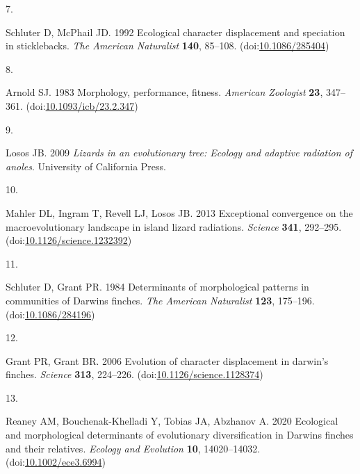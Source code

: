 \documentclass[
  11pt,
]{article}
\newlength{\cslhangindent}
\newlength{\csllabelwidth}
\newlength{\cslentryspacingunit} %
\newenvironment{CSLReferences}[2] %
 {%
  \setlength{\parindent}{0pt}
  \ifodd #1
  \let\oldpar\par
  \def\par{\hangindent=\cslhangindent\oldpar}
  \fi
  \setlength{\parskip}{#2\cslentryspacingunit}
 }%
 {}
\newcommand{\CSLLeftMargin}[1]{\parbox[t]{\csllabelwidth}{#1}}
\newcommand{\CSLRightInline}[1]{\parbox[t]{\linewidth - \csllabelwidth}{#1}\break}
\providecommand{\DIFaddbegin}{} %
\providecommand{\DIFaddend}{} %
\providecommand{\DIFdelbegin}{} %
\providecommand{\DIFdelend}{} %
\newcommand{\DIFscaledelfig}{0.5}
\newlength{\DIFdelgraphicswidth} %
\newlength{\DIFdelgraphicsheight} %
\newcommand{\DIFaddincludegraphics}[2][]{{\color{blue}\fbox{\DIFOincludegraphics[#1]{#2}}}} %
\newcommand{\DIFdelincludegraphics}[2][]{%
\sbox{\DIFdelgraphicsbox}{\DIFOincludegraphics[#1]{#2}}%
\settoboxwidth{\DIFdelgraphicswidth}{\DIFdelgraphicsbox} %
\settoboxtotalheight{\DIFdelgraphicsheight}{\DIFdelgraphicsbox} %
\scalebox{\DIFscaledelfig}{%
\parbox[b]{\DIFdelgraphicswidth}{\usebox{\DIFdelgraphicsbox}\\[-\baselineskip] \rule{\DIFdelgraphicswidth}{0em}}\llap{\resizebox{\DIFdelgraphicswidth}{\DIFdelgraphicsheight}{%
\setlength{\unitlength}{\DIFdelgraphicswidth}%
\begin{picture}(1,1)%
\thicklines\linethickness{2pt} %
{\color[rgb]{1,0,0}\put(0,0){\framebox(1,1){}}}%
{\color[rgb]{1,0,0}\put(0,0){\line( 1,1){1}}}%
{\color[rgb]{1,0,0}\put(0,1){\line(1,-1){1}}}%
\end{picture}%
}\hspace*{3pt}}} %
} %
\DeclareRobustCommand{\DIFaddbegin}{\DIFOaddbegin \let\includegraphics\DIFaddincludegraphics} %
\DeclareRobustCommand{\DIFaddend}{\DIFOaddend \let\includegraphics\DIFOincludegraphics} %
\DeclareRobustCommand{\DIFdelbegin}{\DIFOdelbegin \let\includegraphics\DIFdelincludegraphics} %
\DeclareRobustCommand{\DIFdelend}{\DIFOaddend \let\includegraphics\DIFOincludegraphics} %
\begin{document}
\begin{CSLReferences}{0}{0}
\leavevmode{}%
\CSLLeftMargin{7. }%
\CSLRightInline{Schluter D, McPhail JD. 1992 Ecological character
displacement and speciation in sticklebacks. \emph{The American
Naturalist} \textbf{140}, 85--108.
(doi:\href{https://doi.org/10.1086/285404}{10.1086/285404})}

\leavevmode{}%
\CSLLeftMargin{8. }%
\CSLRightInline{Arnold SJ. 1983 Morphology, performance, fitness.
\emph{American Zoologist} \textbf{23}, 347--361.
(doi:\href{https://doi.org/10.1093/icb/23.2.347}{10.1093/icb/23.2.347})}

\leavevmode{}%
\CSLLeftMargin{9. }%
\CSLRightInline{Losos JB. 2009 \emph{Lizards in an evolutionary tree:
Ecology and adaptive radiation of anoles}. University of California
Press. }

\leavevmode{}%
\CSLLeftMargin{10. }%
\CSLRightInline{Mahler DL, Ingram T, Revell LJ, Losos JB. 2013
Exceptional convergence on the macroevolutionary landscape in island
lizard radiations. \emph{Science} \textbf{341}, 292--295.
(doi:\href{https://doi.org/10.1126/science.1232392}{10.1126/science.1232392})}

\leavevmode{}%
\CSLLeftMargin{11. }%
\DIFdelbegin %
\DIFdelend \DIFaddbegin \CSLRightInline{Schluter D, Grant PR. 1984 Determinants of morphological
patterns in communities of {D}arwin{\textquotesingle}s finches.
\emph{The American Naturalist} \textbf{123}, 175--196.
(doi:\href{https://doi.org/10.1086/284196}{10.1086/284196})}
\DIFaddend 

\leavevmode{}%
\CSLLeftMargin{12. }%
\CSLRightInline{Grant PR, Grant BR. 2006 Evolution of character
displacement in darwin's finches. \emph{Science} \textbf{313}, 224--226.
(doi:\href{https://doi.org/10.1126/science.1128374}{10.1126/science.1128374})}

\leavevmode{}%
\CSLLeftMargin{13. }%
\DIFdelbegin %
\DIFdelend \DIFaddbegin \CSLRightInline{Reaney AM, Bouchenak-Khelladi Y, Tobias JA, Abzhanov A.
2020 Ecological and morphological determinants of evolutionary
diversification in {D}arwin{\textquotesingle}s finches and their
relatives. \emph{Ecology and Evolution} \textbf{10}, 14020--14032.
(doi:\href{https://doi.org/10.1002/ece3.6994}{10.1002/ece3.6994})}
\DIFaddend 


\end{CSLReferences}
\end{document}
